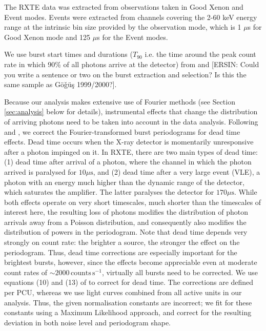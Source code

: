\documentclass[numberedappendix]{emulateapj}
\begin{document}
The RXTE data was extracted from observations taken in Good Xenon and Event modes. Events were extracted from channels covering the 2-60 keV energy range at the intrinsic bin size provided by the observation mode, which is 1 $\mu$s for Good Xenon mode and 125 $\mu$s for the Event modes.  
 
We use burst start times and durations ($T_{90}$ i.e. the time around the peak count rate in which 90\% of all photons arrive at the detector) from \citet{gogus1999} and \citet{gogus2000} [ERSIN: Could you write a sentence or two on the burst extraction and selection? Is this the same sample as G{\"o}{\v g}{\"u}{\c s} 1999/2000?]. 

Because our analysis makes extensive use of Fourier methods (see Section \ref{sec:analysis} below for details), instrumental effects that change the distribution of arriving photons need to be taken into account in the data analysis.
Following \citet{zhang1995} and \citet{jahoda2006}, we correct the Fourier-transformed burst periodograms for dead time effects. Dead time occurs when the X-ray detector is momentarily unresponsive after a photon impinged on it. In RXTE, there are two main types of dead time: (1) dead time after arrival of a photon, where the channel in which the photon arrived is paralysed for $10\mu\mathrm{s}$, and (2) dead time after a very large event (VLE), a photon with an energy much higher than the dynamic range of the detector, which saturates the amplifier. The latter paralyses the detector for $170\mu\mathrm{s}$. While both effects operate on very short timescales, much shorter than the timescales of interest here, the resulting loss of photons modifies the distribution of photon arrivals away from a Poisson distribution, and consequently also modifies the distribution of powers in the periodogram. Note that dead time depends very strongly on count rate: the brighter a source, the stronger the effect on the periodogram. Thus, dead time corrections are especially important for the brightest bursts, however, since the effects become appreciable even at moderate count rates of $\sim 2000 \,\mathrm{counts}\,\mathrm{s}^{-1}$, virtually all bursts need to be corrected. We use equations (10) and (13) of \citet{jahoda2006} to correct for dead time. The corrections are defined per PCU, whereas we use light curves combined from all active units in our analysis. Thus, the given normalisation constants are incorrect; we fit for these constants using a Maximum Likelihood approach, and correct for the resulting deviation in both noise level and periodogram shape. 
\end{document}
